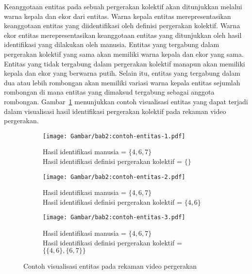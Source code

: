 Keanggotaan entitas pada sebuah pergerakan kolektif akan ditunjukkan melalui warna kepala dan ekor dari entitas. Warna kepala entitas merepresentasikan keanggotaan entitas yang diidentifikasi oleh definisi pergerakan kolektif. Warna ekor entitas merepresentasikan keanggotaan entitas yang ditunjukkan oleh hasil identifikasi yang dilakukan oleh manusia. Entitas yang tergabung dalam pergerakan kolektif yang sama akan memiliki warna kepala dan ekor yang sama. Entitas yang tidak tergabung dalam pergerakan kolektif manapun akan memiliki kepala dan ekor yang berwarna putih. Selain itu, entitas yang tergabung dalam dua atau lebih rombongan akan memiliki variasi warna kepala entitas sejumlah rombongan di mana entitas yang dimaksud tergabung sebagai anggota rombongan. Gambar~\ref{bab2:contoh-visualisasi-entitas} menunjukkan contoh visualisasi entitas yang dapat terjadi dalam visualisasi hasil identifikasi pergerakan kolektif pada rekaman video pergerakan.

\begin{figure}[b!]
    \centering
    \begin{subfigure}[h]{0.3\textwidth}
        \centering
        \texttt{[image: Gambar/bab2:contoh-entitas-1.pdf]}
        \caption{Hasil identifikasi manusia = $\{4, 6, 7\}$ \\ Hasil identifikasi definisi pergerakan kolektif = $\{\}$}
    \end{subfigure} \hspace{0.25cm}
    \begin{subfigure}[h]{0.3\textwidth}
        \centering
        \texttt{[image: Gambar/bab2:contoh-entitas-2.pdf]}
        \caption{Hasil identifikasi manusia = $\{4, 6, 7\}$ \\ Hasil identifikasi definisi pergerakan kolektif = $\{4, 6\}$}
    \end{subfigure} \hspace{0.25cm}
    \begin{subfigure}[h]{0.3\textwidth}
        \centering
        \texttt{[image: Gambar/bab2:contoh-entitas-3.pdf]}
        \caption{Hasil identifikasi manusia = $\{4, 6, 7\}$ \\ Hasil identifikasi definisi pergerakan kolektif = $\{\{4, 6\}, \{6, 7\}\}$}
    \end{subfigure}
    \caption{Contoh visualisasi entitas pada rekaman video pergerakan}
    \label{bab2:contoh-visualisasi-entitas}
\end{figure}

